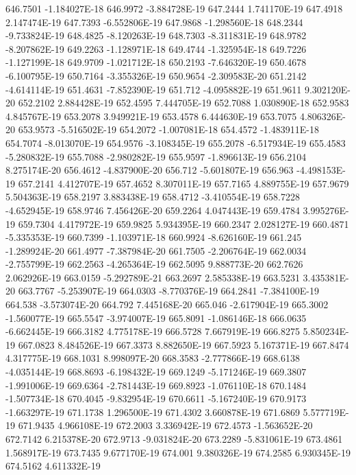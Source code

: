 646.7501  -1.184027E-18
646.9972  -3.884728E-19
647.2444  1.741170E-19
647.4918  2.147474E-19
647.7393  -6.552806E-19
647.9868  -1.298560E-18
648.2344  -9.733824E-19
648.4825  -8.120263E-19
648.7303  -8.311831E-19
648.9782  -8.207862E-19
649.2263  -1.128971E-18
649.4744  -1.325954E-18
649.7226  -1.127199E-18
649.9709  -1.021712E-18
650.2193  -7.646320E-19
650.4678  -6.100795E-19
650.7164  -3.355326E-19
650.9654  -2.309583E-20
651.2142  -4.614114E-19
651.4631  -7.852390E-19
651.712  -4.095882E-19
651.9611  9.302120E-20
652.2102  2.884428E-19
652.4595  7.444705E-19
652.7088  1.030890E-18
652.9583  4.845767E-19
653.2078  3.949921E-19
653.4578  6.444630E-19
653.7075  4.806326E-20
653.9573  -5.516502E-19
654.2072  -1.007081E-18
654.4572  -1.483911E-18
654.7074  -8.013070E-19
654.9576  -3.108345E-19
655.2078  -6.517934E-19
655.4583  -5.280832E-19
655.7088  -2.980282E-19
655.9597  -1.896613E-19
656.2104  8.275174E-20
656.4612  -4.837900E-20
656.712  -5.601807E-19
656.963  -4.498153E-19
657.2141  4.412707E-19
657.4652  8.307011E-19
657.7165  4.889755E-19
657.9679  5.504363E-19
658.2197  3.883438E-19
658.4712  -3.410554E-19
658.7228  -4.652945E-19
658.9746  7.456426E-20
659.2264  4.047443E-19
659.4784  3.995276E-19
659.7304  4.417972E-19
659.9825  5.934395E-19
660.2347  2.028127E-19
660.4871  -5.335353E-19
660.7399  -1.103971E-18
660.9924  -8.626160E-19
661.245  -1.289924E-20
661.4977  -7.387984E-20
661.7505  -2.206764E-19
662.0034  -2.755799E-19
662.2563  -4.265364E-19
662.5095  9.888773E-20
662.7626  2.062926E-19
663.0159  -5.292789E-21
663.2697  2.585338E-19
663.5231  3.435381E-20
663.7767  -5.253907E-19
664.0303  -8.770376E-19
664.2841  -7.384100E-19
664.538  -3.573074E-20
664.792  7.445168E-20
665.046  -2.617904E-19
665.3002  -1.560077E-19
665.5547  -3.974007E-19
665.8091  -1.086146E-18
666.0635  -6.662445E-19
666.3182  4.775178E-19
666.5728  7.667919E-19
666.8275  5.850234E-19
667.0823  8.484526E-19
667.3373  8.882650E-19
667.5923  5.167371E-19
667.8474  4.317775E-19
668.1031  8.998097E-20
668.3583  -2.777866E-19
668.6138  -4.035144E-19
668.8693  -6.198432E-19
669.1249  -5.171246E-19
669.3807  -1.991006E-19
669.6364  -2.781443E-19
669.8923  -1.076110E-18
670.1484  -1.507734E-18
670.4045  -9.832954E-19
670.6611  -5.167240E-19
670.9173  -1.663297E-19
671.1738  1.296500E-19
671.4302  3.660878E-19
671.6869  5.577719E-19
671.9435  4.966108E-19
672.2003  3.336942E-19
672.4573  -1.563652E-20
672.7142  6.215378E-20
672.9713  -9.031824E-20
673.2289  -5.831061E-19
673.4861  1.568917E-19
673.7435  9.677170E-19
674.001  9.380326E-19
674.2585  6.930345E-19
674.5162  4.611332E-19
